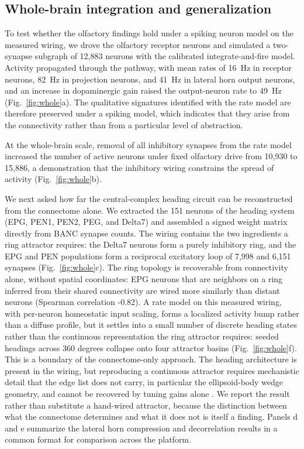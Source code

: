 \documentclass[9pt,twocolumn,twoside]{article}
\begin{document}
\subsection{Whole-brain integration and generalization}
To test whether the olfactory findings hold under a spiking neuron model on the measured wiring, we
drove the olfactory receptor neurons and simulated a two-synapse subgraph of 12,883 neurons with the
calibrated integrate-and-fire model. Activity propagated through the pathway, with mean rates of
16~Hz in receptor neurons, 82~Hz in projection neurons, and 41~Hz in lateral horn output neurons, and
an increase in dopaminergic gain raised the output-neuron rate to 49~Hz (Fig.~\ref{fig:whole}a). The
qualitative signatures identified with the rate model are therefore preserved under a spiking model,
which indicates that they arise from the connectivity rather than from a particular level of
abstraction.

At the whole-brain scale, removal of all inhibitory synapses from the rate model increased the number
of active neurons under fixed olfactory drive from 10,930 to 15,886, a demonstration that the
inhibitory wiring constrains the spread of activity (Fig.~\ref{fig:whole}b).

We next asked how far the central-complex heading circuit can be reconstructed from the connectome
alone. We extracted the 151 neurons of the heading system (EPG, PEN1, PEN2, PEG, and Delta7) and
assembled a signed weight matrix directly from BANC synapse counts. The wiring contains the two
ingredients a ring attractor requires: the Delta7 neurons form a purely inhibitory ring, and the EPG
and PEN populations form a reciprocal excitatory loop of 7,998 and 6,151 synapses
(Fig.~\ref{fig:whole}c). The ring topology is recoverable from connectivity alone, without spatial
coordinates: EPG neurons that are neighbors on a ring inferred from their shared connectivity are
wired more similarly than distant neurons (Spearman correlation -0.82). A rate model on this measured
wiring, with per-neuron homeostatic input scaling, forms a localized activity bump rather than a
diffuse profile, but it settles into a small number of discrete heading states rather than the
continuous representation the ring attractor requires: seeded headings across 360 degrees collapse
onto four attractor basins (Fig.~\ref{fig:whole}f). This is a boundary of the connectome-only
approach. The heading architecture is present in the wiring, but reproducing a continuous attractor
requires mechanistic detail that the edge list does not carry, in particular the ellipsoid-body wedge
geometry, and cannot be recovered by tuning gains alone \cite{seelig2015}. We report the result rather
than substitute a hand-wired attractor, because the distinction between what the connectome
determines and what it does not is itself a finding. Panels d and e summarize the lateral horn
compression and decorrelation results in a common format for comparison across the platform.
\end{document}

